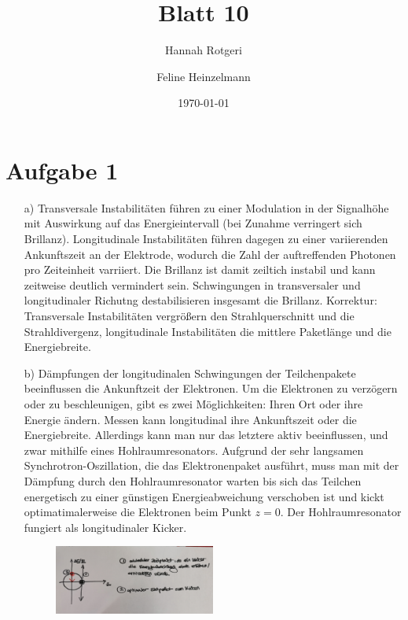 \documentclass[11pt,a4paper]{article}
\title{Blatt 10}
\date{\today}
\author{Hannah Rotgeri \and Feline Heinzelmann}
\begin{document}
    \maketitle

    \section*{Aufgabe 1}
	\begin{itemize}
		\item[a)] 
			Transversale Instabilitäten führen zu einer Modulation in der Signalhöhe mit Auswirkung auf das Energieintervall (bei Zunahme verringert sich Brillanz).
			Longitudinale Instabilitäten führen dagegen zu einer variierenden Ankunftszeit an der Elektrode, wodurch die Zahl der auftreffenden Photonen pro Zeiteinheit varriiert. 
			Die Brillanz ist damit zeiltich instabil und kann zeitweise deutlich vermindert sein. 
			Schwingungen in transversaler und longitudinaler Richutng destabilisieren insgesamt die Brillanz. \newline
			Korrektur: Transversale Instabilitäten vergrößern den Strahlquerschnitt und die Strahldivergenz, longitudinale Instabilitäten die mittlere Paketlänge und die Energiebreite.

		\item[b)]
			Dämpfungen der longitudinalen Schwingungen der Teilchenpakete beeinflussen die Ankunftzeit der Elektronen. Um die Elektronen zu verzögern oder zu beschleunigen, gibt es zwei Möglichkeiten: Ihren Ort oder ihre Energie ändern. Messen kann longitudinal ihre Ankunftszeit oder die Energiebreite.
			Allerdings kann man nur das letztere aktiv beeinflussen, und zwar mithilfe eines Hohlraumresonators. Aufgrund der sehr langsamen Synchrotron-Oszillation, die das Elektronenpaket ausführt, muss man mit der Dämpfung durch den Hohlraumresonator warten bis sich das Teilchen energetisch 
			zu einer günstigen Energieabweichung verschoben ist und kickt optimatimalerweise die Elektronen beim Punkt $z=0$. Der Hohlraumresonator fungiert als longitudinaler Kicker.
			\begin{figure}
				\includegraphics[width=0.5\textwidth]{IMG_20200708_085910.jpg}
			\end{figure}

	\end{itemize}
\end{document}
